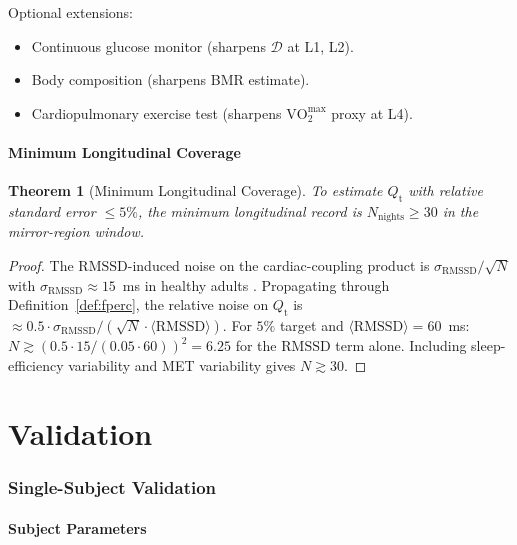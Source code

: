 \documentclass[11pt,twocolumn,a4paper]{article}
\newtheorem{theorem}{Theorem}[section]
\theoremstyle{definition}
\theoremstyle{remark}
\newcommand{\Qt}{Q_{\mathrm{t}}}
\newcommand{\RMSSD}{\mathrm{RMSSD}}
\newcommand{\Dhier}{\mathcal{D}}
\begin{document}
Optional extensions:
\begin{itemize}[leftmargin=*]
\item Continuous glucose monitor (sharpens $\Dhier$ at L1, L2).
\item Body composition (sharpens BMR estimate).
\item Cardiopulmonary exercise test (sharpens $\mathrm{VO}_2^{\max}$
proxy at L4).
\end{itemize}

\subsection{Minimum Longitudinal Coverage}

\begin{theorem}[Minimum Longitudinal Coverage]
\label{thm:minlength}
To estimate $\Qt$ with relative standard error $\leq 5\%$, the
minimum longitudinal record is $N_{\mathrm{nights}} \geq 30$ in the
mirror-region window.
\end{theorem}

\begin{proof}
The $\RMSSD$-induced noise on the cardiac-coupling product is
$\sigma_{\RMSSD}/\sqrt{N}$ with $\sigma_{\RMSSD} \approx 15$~ms in
healthy adults \citep{shaffer2017}. Propagating through
Definition~\ref{def:fperc}, the relative noise on $\Qt$ is
$\approx 0.5 \cdot \sigma_{\RMSSD}/(\sqrt{N} \cdot \langle \RMSSD
\rangle)$. For $5\%$ target and $\langle \RMSSD \rangle = 60$~ms:
$N \gtrsim (0.5 \cdot 15/(0.05 \cdot 60))^2 = 6.25$ for the
$\RMSSD$ term alone. Including sleep-efficiency variability and
MET variability gives $N \gtrsim 30$.
\end{proof}

\part{Validation}

\section{Single-Subject Validation}
\label{sec:validation}

\subsection{Subject Parameters}
\end{document}
